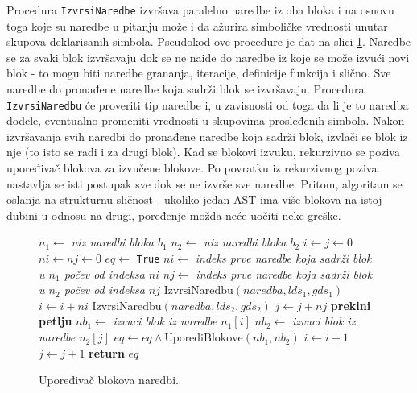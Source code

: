 Procedura \texttt{IzvrsiNaredbe} izvršava paralelno naredbe iz oba bloka i na osnovu toga koje su naredbe u pitanju može i da ažurira simboličke vrednosti unutar skupova deklarisanih simbola. Pseudokod ove procedure je dat na slici \ref{fig:ComparisonAlgorithmBlocksPseudo1}. Naredbe se za svaki blok izvršavaju dok se ne naiđe do naredbe iz koje se može izvući novi blok - to mogu biti naredbe grananja, iteracije, definicije funkcija i slično. Sve naredbe do pronađene naredbe koja sadrži blok se izvršavaju. Procedura \texttt{IzvrsiNaredbu} će proveriti tip naredbe i, u zavisnosti od toga da li je to naredba dodele, eventualno promeniti vrednosti u skupovima prosleđenih simbola. Nakon izvršavanja svih naredbi do pronađene naredbe koja sadrži blok, izvlači se blok iz nje (to isto se radi i za drugi blok). Kad se blokovi izvuku, rekurzivno se poziva upoređivač blokova za izvučene blokove. Po povratku iz rekurzivnog poziva nastavlja se isti postupak sve dok se ne izvrše sve naredbe. Pritom, algoritam se oslanja na strukturnu sličnost - ukoliko jedan AST ima više blokova na istoj dubini u odnosu na drugi, poređenje možda neće uočiti neke greške.

\begin{figure}[!h]
\begin{algorithmic}[1]
\State $n_1 \gets $ \emph{niz naredbi bloka $b_1$} 
\State $n_2 \gets $ \emph{niz naredbi bloka $b_2$}
\State $i \gets j \gets 0$
\State $ni \gets nj \gets 0$
\State $eq \gets $ \texttt{True}
    \State $ni \gets $ \emph{indeks prve naredbe koja sadrži blok u $n_1$ počev od indeksa $ni$}
    \State $nj \gets $ \emph{indeks prve naredbe koja sadrži blok u $n_2$ počev od indeksa $nj$}
        \State $\text{IzvrsiNaredbu}(naredba, lds_1, gds_1)$
    \EndFor
    \State $i \gets i + ni$
        \State $\text{IzvrsiNaredbu}(naredba, lds_2, gds_2)$
    \EndFor
    \State $j \gets j + nj$
        \State \textbf{prekini petlju}
    \EndIf
    \State $nb_1 \gets $ \emph{izvuci blok iz naredbe $n_1[i]$}
    \State $nb_2 \gets $ \emph{izvuci blok iz naredbe $n_2[j]$}
    \State $eq \gets eq \wedge \text{UporediBlokove}(nb_1, nb_2)$
    \State $i \gets i + 1$
    \State $j \gets j + 1$
\EndWhile
\State \textbf{return} $eq$
\EndProcedure
\end{algorithmic}
\caption{Upoređivač blokova naredbi.}
\label{fig:ComparisonAlgorithmBlocksPseudo1}
\end{figure}

